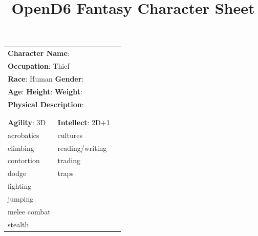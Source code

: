 \documentclass[10pt]{article}
\title{OpenD6 Fantasy Character Sheet}
\begin{document}
\pagestyle{fancy}
\fancyhf{}
\fancyfoot[R]{\thepage}
\renewcommand{\headrulewidth}{0pt}


\cleardoublepage
\begin{table}
\begin{tabular}{m{156pt} m{156pt} m{156pt}}
    \multicolumn{2}{l}{\textbf{Character Name}:  \hrulefill} \\
    \multicolumn{2}{l}{\textbf{Occupation}: Thief \hrulefill} \\
    \multicolumn{2}{l}{\textbf{Race}: Human \hrulefill \hspace{1em} \textbf{Gender}:  \hrulefill} \\
    \multicolumn{2}{l}{\textbf{Age}:  \hrulefill \hspace{1em} \textbf{Height}:  \hrulefill \hspace{1em}  \textbf{Weight}:  \hrulefill } \\
    \multicolumn{2}{l}{\textbf{Physical Description}:  \hrulefill } \\
    \multicolumn{2}{l}{ \hrulefill } \\
 & & \\
\textbf{Agility}: 3D \hrulefill      & \textbf{Intellect}: 2D+1 \hrulefill  &                             \\

acrobatics           \hrulefill & cultures             \hrulefill & \\

climbing             \hrulefill & reading/writing      \hrulefill & \\

contortion           \hrulefill & trading              \hrulefill & \\

dodge                \hrulefill & traps                \hrulefill & \\

fighting             \hrulefill &  \hrulefill & \\

jumping              \hrulefill &  \hrulefill & \\

melee combat         \hrulefill &  \hrulefill & \\

stealth              \hrulefill &  \hrulefill & \\


\end{tabular}
\end{table}
\end{document}
